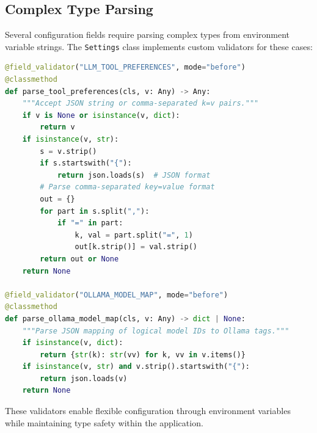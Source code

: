 \subsection{Complex Type Parsing}

Several configuration fields require parsing complex types from environment variable strings. The \texttt{Settings} class implements custom validators for these cases:

\begin{lstlisting}[language=Python, caption=Complex type parsing for LLM configuration]
@field_validator("LLM_TOOL_PREFERENCES", mode="before")
@classmethod
def parse_tool_preferences(cls, v: Any) -> Any:
    """Accept JSON string or comma-separated k=v pairs."""
    if v is None or isinstance(v, dict):
        return v
    if isinstance(v, str):
        s = v.strip()
        if s.startswith("{"):
            return json.loads(s)  # JSON format
        # Parse comma-separated key=value format
        out = {}
        for part in s.split(","):
            if "=" in part:
                k, val = part.split("=", 1)
                out[k.strip()] = val.strip()
        return out or None
    return None

@field_validator("OLLAMA_MODEL_MAP", mode="before")
@classmethod
def parse_ollama_model_map(cls, v: Any) -> dict | None:
    """Parse JSON mapping of logical model IDs to Ollama tags."""
    if isinstance(v, dict):
        return {str(k): str(vv) for k, vv in v.items()}
    if isinstance(v, str) and v.strip().startswith("{"):
        return json.loads(v)
    return None
\end{lstlisting}

These validators enable flexible configuration through environment variables while maintaining type safety within the application.

